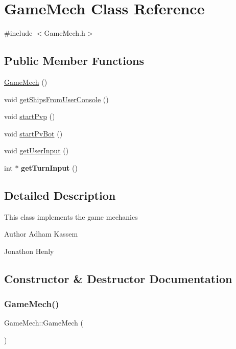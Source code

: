 \hypertarget{classGameMech}{}\section{Game\+Mech Class Reference}
\label{classGameMech}


{\ttfamily \#include $<$Game\+Mech.\+h$>$}

\subsection*{Public Member Functions}
\begin{DoxyCompactItemize}
\item 
\hyperlink{classGameMech_a73735ea1dac66c896fe3befb4425b1ee}{Game\+Mech} ()
\item 
void \hyperlink{classGameMech_acd8210b1f72b612ac0f1c3fad6d4a1da}{get\+Ships\+From\+User\+Console} ()
\item 
void \hyperlink{classGameMech_a2e6458b7b49afecdba3b1c2103d7875d}{start\+Pvp} ()
\item 
void \hyperlink{classGameMech_aceb6fd4797f93d9ffa9601a16b05eea6}{start\+Pv\+Bot} ()
\item 
void \hyperlink{classGameMech_a92543cf17b1dab64543d3d08c6ea621b}{get\+User\+Input} ()
\item 
\mbox{\label{classGameMech_ae80d651eabb590b343ee548c68a1ac96}} 
int $\ast$ {\bfseries get\+Turn\+Input} ()
\end{DoxyCompactItemize}


\subsection{Detailed Description}
This class implements the game mechanics \begin{DoxyAuthor}{Author}
Adham Kassem 

Jonathon Henly 
\end{DoxyAuthor}


\subsection{Constructor \& Destructor Documentation}
\mbox{\label{classGameMech_a73735ea1dac66c896fe3befb4425b1ee}} 
\subsubsection{\texorpdfstring{Game\+Mech()}{GameMech()}}
{\footnotesize\ttfamily Game\+Mech\+::\+Game\+Mech (\begin{DoxyParamCaption}{ }\end{DoxyParamCaption})\hspace{0.3cm}{\ttfamily [inline]}}

